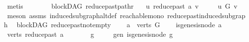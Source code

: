 \begin{isabellebody}
\ metis\isanewline
\ \ \ \ \ \isanewline
{}\isamarkupfalse%
%
\endisatagproof
{\isafoldproof}%
%
\isadelimproof
\isanewline
%
\endisadelimproof
\isanewline
\isanewline
{}\isamarkupfalse%
\ {\isacharparenleft}{\kern0pt}\ blockDAG{\isacharparenright}{\kern0pt}\ reduce{\isacharunderscore}{\kern0pt}past{\isacharunderscore}{\kern0pt}pathr{\isacharcolon}{\kern0pt}\isanewline
\ \ \ {\isachardoublequoteopen}u\ {\isasymrightarrow}\isactrlsup {\isacharasterisk}{\kern0pt}\isactrlbsub reduce{\isacharunderscore}{\kern0pt}past\ a\isactrlesub \ v{\isachardoublequoteclose}\ \isanewline
\ \ \ {\isachardoublequoteopen}\ u\ {\isasymrightarrow}\isactrlsup {\isacharasterisk}{\kern0pt}\isactrlbsub G\isactrlesub \ v{\isachardoublequoteclose}\isanewline
%
\isadelimproof
\ \ %
\endisadelimproof
%
\isatagproof
{}\isamarkupfalse%
\ {\isacharparenleft}{\kern0pt}meson\ assms\ induced{\isacharunderscore}{\kern0pt}subgraph{\isacharunderscore}{\kern0pt}altdef\ reachable{\isacharunderscore}{\kern0pt}mono\ reduce{\isacharunderscore}{\kern0pt}past{\isacharunderscore}{\kern0pt}induced{\isacharunderscore}{\kern0pt}subgraph{\isacharparenright}{\kern0pt}%
\endisatagproof
{\isafoldproof}%
%
\isadelimproof
\isanewline
%
\endisadelimproof
\isanewline
\isanewline
\isanewline
{}\isamarkupfalse%
\ {\isacharparenleft}{\kern0pt}\ blockDAG{\isacharparenright}{\kern0pt}\ reduce{\isacharunderscore}{\kern0pt}past{\isacharunderscore}{\kern0pt}not{\isacharunderscore}{\kern0pt}empty{\isacharcolon}{\kern0pt}\isanewline
\ \ \ {\isachardoublequoteopen}\ a\ {\isasymin}\ verts\ G{\isachardoublequoteclose}\isanewline
\ \ \ \ {\isachardoublequoteopen}{\isasymnot}is{\isacharunderscore}{\kern0pt}genesis{\isacharunderscore}{\kern0pt}node\ a{\isachardoublequoteclose}\isanewline
{}\ {\isachardoublequoteopen}{\isacharparenleft}{\kern0pt}verts\ {\isacharparenleft}{\kern0pt}reduce{\isacharunderscore}{\kern0pt}past\ a{\isacharparenright}{\kern0pt}{\isacharparenright}{\kern0pt}\ {\isasymnoteq}\ {\isacharbraceleft}{\kern0pt}{\isacharbraceright}{\kern0pt}{\isachardoublequoteclose}\isanewline
%
\isadelimproof
%
\endisadelimproof
%
\isatagproof
{}\isamarkupfalse%
\ {\isacharminus}{\kern0pt}\isanewline
\ \ \isamarkupfalse%
\ g\isanewline
\ \ \ \ \ gen{\isacharcolon}{\kern0pt}\ {\isachardoublequoteopen}is{\isacharunderscore}{\kern0pt}genesis{\isacharunderscore}{\kern0pt}node\ g{\isachardoublequoteclose}\ \isamarkupfalse%

\end{isabellebody}
